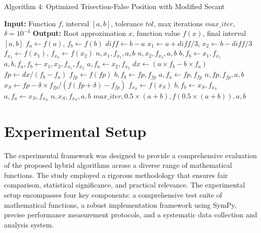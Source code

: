 \documentclass[amsmath, amssymb, aps]{revtex4-2}
\begin{document}
\begin{algorithm}[H]
\caption{Algorithm 4: Optimized Trisection-False Position with Modified Secant}
\begin{algorithmic}[1]
\State \textbf{Input:} Function $f$, interval $[a, b]$, tolerance $tol$, max iterations $max\_iter$, $\delta = 10^{-4}$
\State \textbf{Output:} Root approximation $x$, function value $f(x)$, final interval $[a, b]$
\State $f_a \gets f(a)$, $f_b \gets f(b)$
    \State $diff \gets b - a$
    \State $x_1 \gets a + diff/3$, $x_2 \gets b - diff/3$
    \State $f_{x_1} \gets f(x_1)$, $f_{x_2} \gets f(x_2)$
        \State \Return $n, x_1, f_{x_1}, a, b$
    \EndIf
        \State \Return $n, x_2, f_{x_2}, a, b$
    \EndIf
        \State $b, f_b \gets x_1, f_{x_1}$
        \State $a, b, f_a, f_b \gets x_1, x_2, f_{x_1}, f_{x_2}$
    \Else
        \State $a, f_a \gets x_2, f_{x_2}$
    \EndIf
    \State $dx \gets (a \times f_b - b \times f_a)$
    \State $fp \gets dx / (f_b - f_a)$
    \State $f_{fp} \gets f(fp)$
        \State $b, f_b \gets fp, f_{fp}$
    \Else
        \State $a, f_a \gets fp, f_{fp}$
    \EndIf
        \State \Return $n, fp, f_{fp}, a, b$
    \EndIf
    \State $x_S \gets fp - \delta \times f_{fp} / (f(fp + \delta) - f_{fp})$
        \State $f_{x_S} \gets f(x_S)$
                \State $b, f_b \gets x_S, f_{x_S}$
            \Else
                \State $a, f_a \gets x_S, f_{x_S}$
            \EndIf
                \State \Return $n, x_S, f_{x_S}, a, b$
            \EndIf
        \EndIf
    \EndIf
\EndFor
\State \Return $max\_iter, 0.5 \times (a + b), f(0.5 \times (a + b)), a, b$
\end{algorithmic}
\end{algorithm}

\section{Experimental Setup}

The experimental framework was designed to provide a comprehensive evaluation of the proposed hybrid algorithms across a diverse range of mathematical functions. The study employed a rigorous methodology that ensures fair comparison, statistical significance, and practical relevance. The experimental setup encompasses four key components: a comprehensive test suite of mathematical functions, a robust implementation framework using SymPy, precise performance measurement protocols, and a systematic data collection and analysis system.
\end{document}
